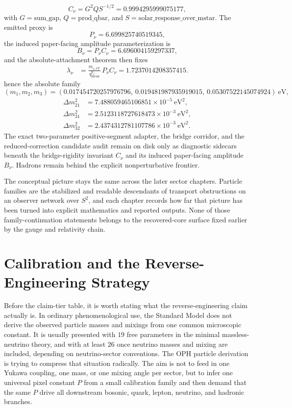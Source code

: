 \documentclass[11pt]{article}
\begin{document}
\[
C_\nu = G^2 Q S^{-1/2} = 0.9994295999075177,
\]
with \(G=\mathrm{sum\_gap}\), \(Q=\mathrm{prod\_qbar}\), and \(S=\mathrm{solar\_response\_over\_mstar}\).
The emitted proxy is
\[
P_\nu=6.699825740519345,
\]
the induced paper-facing amplitude parameterization is
\[
B_\nu=P_\nu C_\nu=6.696004159297337,
\]
and the absolute-attachment theorem then fixes
\[
\begin{aligned}
\lambda_\nu&=\frac{m_{\star,\mathrm{eV}}}{q_{\mathrm{mean}}^{p_\nu}}\,P_\nu C_\nu=1.7237014208357415.
\end{aligned}
\]
hence the absolute family
\[
(m_1,m_2,m_3)=(0.017454720257976796,\ 0.019481987935919015,\ 0.05307522145074924)\ \mathrm{eV},
\]
\[
\begin{aligned}
\Delta m_{21}^2&=7.488059465106851\times10^{-5}\ \mathrm{eV}^2,\\
\Delta m_{31}^2&=2.5123118727618473\times10^{-3}\ \mathrm{eV}^2,\\
\Delta m_{32}^2&=2.4374312781107786\times10^{-3}\ \mathrm{eV}^2.
\end{aligned}
\]
The exact two-parameter positive-segment adapter, the bridge corridor, and the reduced-correction candidate audit remain on disk only as diagnostic sidecars beneath the bridge-rigidity invariant \(C_\nu\) and its induced paper-facing amplitude \(B_\nu\). Hadrons remain behind the explicit nonperturbative frontier.

The conceptual picture stays the same across the later sector chapters. Particle families are the
stabilized and readable descendants of transport obstructions on an observer network over \(S^2\),
and each chapter records how far that picture has been turned into explicit mathematics and
reported outputs. None of those family-continuation statements belongs to the recovered-core
surface fixed earlier by the gauge and relativity chain.

\section{Calibration and the Reverse-Engineering Strategy}

Before the claim-tier table, it is worth stating what the reverse-engineering claim actually is. In
ordinary phenomenological use, the Standard Model does not derive the observed particle masses and
mixings from one common microscopic constant. It is usually presented with \(19\) free parameters
in the minimal massless-neutrino theory, and with at least \(26\) once neutrino masses and mixing
are included, depending on neutrino-sector conventions. The OPH particle derivation is trying to
compress that situation radically. The aim is not to feed in one Yukawa coupling, one mass, or
one mixing angle per sector, but to infer one universal pixel constant \(P\) from a small
calibration family and then demand that the same \(P\) drive all downstream bosonic, quark,
lepton, neutrino, and hadronic branches.
\end{document}

